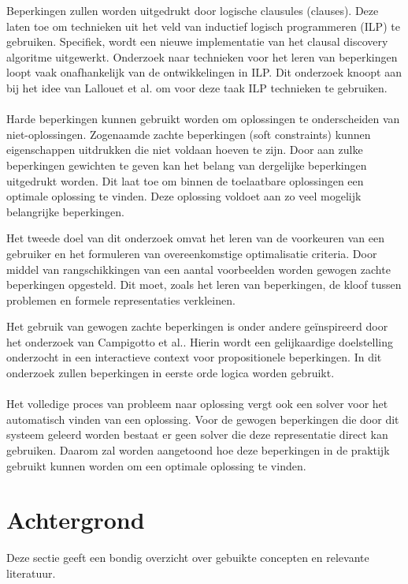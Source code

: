 Beperkingen zullen worden uitgedrukt door logische clausules (clauses).
Deze laten toe om technieken uit het veld van inductief logisch programmeren (ILP) te gebruiken.
Specifiek, wordt een nieuwe implementatie van het clausal discovery algoritme\cite{DeRaedt:ClausalDiscovery} uitgewerkt.
Onderzoek naar technieken voor het leren van beperkingen loopt vaak onafhankelijk van de ontwikkelingen in ILP.
Dit onderzoek knoopt aan bij het idee van Lallouet et al.\cite{Lallouet:LearningCP} om voor deze taak ILP technieken te gebruiken.
\\\\
Harde beperkingen kunnen gebruikt worden om oplossingen te onderscheiden van niet-oplossingen.
Zogenaamde zachte beperkingen (soft constraints) kunnen eigenschappen uitdrukken die niet voldaan hoeven te zijn.
Door aan zulke beperkingen gewichten te geven kan het belang van dergelijke beperkingen uitgedrukt worden.
Dit laat toe om binnen de toelaatbare oplossingen een optimale oplossing te vinden.
Deze oplossing voldoet aan zo veel mogelijk belangrijke beperkingen.

Het tweede doel van dit onderzoek omvat het leren van de voorkeuren van een gebruiker en het formuleren van overeenkomstige optimalisatie criteria.
Door middel van rangschikkingen van een aantal voorbeelden worden gewogen zachte beperkingen opgesteld.
Dit moet, zoals het leren van beperkingen, de kloof tussen problemen en formele representaties verkleinen.

Het gebruik van gewogen zachte beperkingen is onder andere ge\"inspireerd door het onderzoek van Campigotto et al.\cite{campigotto2011active}.
Hierin wordt een gelijkaardige doelstelling onderzocht in een interactieve context voor propositionele beperkingen.
In dit onderzoek zullen beperkingen in eerste orde logica worden gebruikt.
\\\\
Het volledige proces van probleem naar oplossing vergt ook een solver voor het automatisch vinden van een oplossing.
Voor de gewogen beperkingen die door dit systeem geleerd worden bestaat er geen solver die deze representatie direct kan gebruiken.
Daarom zal worden aangetoond hoe deze beperkingen in de praktijk gebruikt kunnen worden om een optimale oplossing te vinden.


\section{Achtergrond}
Deze sectie geeft een bondig overzicht over gebuikte concepten en relevante literatuur.


